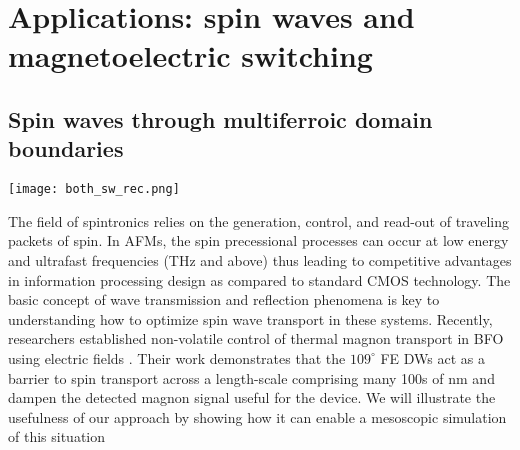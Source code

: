 \documentclass[%
 reprint,
superscriptaddress,
 amsmath,amssymb,
prb,
]{revtex4-1}
\begin{document}
%
\section{Applications: spin waves and magnetoelectric switching}\label{sec:appl}

\subsection{Spin waves through multiferroic domain boundaries}\label{sec:applSpWav}

\begin{figure*}\centering
\hspace*{-10pt}\texttt{[image: both\_sw\_rec.png]}%
\caption{\label{fig:spin_pulse} (a) Excess energy density $f_\mathrm{exc}$ due to a spin wave traveling in the $\mathbf{k}||[100]$ direction. The excitation frequency is $\omega_0 = 0.5$ and $5$ THz for the solid and dashed lines respectively. In this simulation, the 2/1 ($109^\circ$) DW located at approximately 22 nm indicated by the arrow. The wavefront reaches the DW at around 27 ps. (b) Calculated spin wave rectification $R$ as a function of $\omega_0$ of the 1/1 (blue) and 2/1 (red) DWs using Eq.~(\ref{eqn:rec}) after time integrating $f_\mathrm{exc}$ at a distance of $\Delta x = 7$ nm left and right from the DW.}
\end{figure*}

%
The field of spintronics relies on the generation, control, and read-out of traveling packets of spin\cite{Hirohata2020}.
%
In AFMs, the spin precessional processes can occur at low energy and ultrafast frequencies (THz and above) thus leading to competitive advantages in information processing design as compared to standard CMOS technology\cite{Jungwirth2016, Baltz2018}.
%
The basic concept of wave transmission and reflection phenomena is key to understanding how to optimize spin wave transport in these systems.
%
Recently, researchers established non-volatile control of thermal magnon transport in BFO using electric fields \cite{Parsonet2022}.
%
Their work demonstrates that the $109^\circ$ FE DWs act as a barrier to spin transport across a length-scale comprising many 100s of nm and dampen the detected magnon signal useful for the device.
%
We will illustrate the usefulness of our approach by showing how it can enable a mesoscopic simulation of this situation
%
\end{document}
